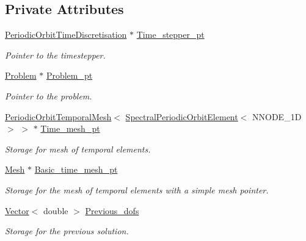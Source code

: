 \subsection*{Private Attributes}
\begin{DoxyCompactItemize}
\item 
\hyperlink{classoomph_1_1PeriodicOrbitTimeDiscretisation}{Periodic\+Orbit\+Time\+Discretisation} $\ast$ \hyperlink{classoomph_1_1PeriodicOrbitAssemblyHandler_ae2a8149c7cd33e41765ef080e1654e81}{Time\+\_\+stepper\+\_\+pt}
\begin{DoxyCompactList}\small\item\em Pointer to the timestepper. \end{DoxyCompactList}\item 
\hyperlink{classoomph_1_1Problem}{Problem} $\ast$ \hyperlink{classoomph_1_1PeriodicOrbitAssemblyHandler_ac3a8b481f99a46352f50186a8f9efe4b}{Problem\+\_\+pt}
\begin{DoxyCompactList}\small\item\em Pointer to the problem. \end{DoxyCompactList}\item 
\hyperlink{classoomph_1_1PeriodicOrbitTemporalMesh}{Periodic\+Orbit\+Temporal\+Mesh}$<$ \hyperlink{classoomph_1_1SpectralPeriodicOrbitElement}{Spectral\+Periodic\+Orbit\+Element}$<$ N\+N\+O\+D\+E\+\_\+1D $>$ $>$ $\ast$ \hyperlink{classoomph_1_1PeriodicOrbitAssemblyHandler_aa6a4d6fc7cfbfd3a1d8babcc3d0e8a90}{Time\+\_\+mesh\+\_\+pt}
\begin{DoxyCompactList}\small\item\em Storage for mesh of temporal elements. \end{DoxyCompactList}\item 
\hyperlink{classoomph_1_1Mesh}{Mesh} $\ast$ \hyperlink{classoomph_1_1PeriodicOrbitAssemblyHandler_ae527e33cddc33225b532e6a64f255483}{Basic\+\_\+time\+\_\+mesh\+\_\+pt}
\begin{DoxyCompactList}\small\item\em Storage for the mesh of temporal elements with a simple mesh pointer. \end{DoxyCompactList}\item 
\hyperlink{classoomph_1_1Vector}{Vector}$<$ double $>$ \hyperlink{classoomph_1_1PeriodicOrbitAssemblyHandler_aac4a358fed9397f2ffcb796252f78025}{Previous\+\_\+dofs}
\begin{DoxyCompactList}\small\item\em Storage for the previous solution. \end{DoxyCompactList}\item 

\end{DoxyCompactItemize}
